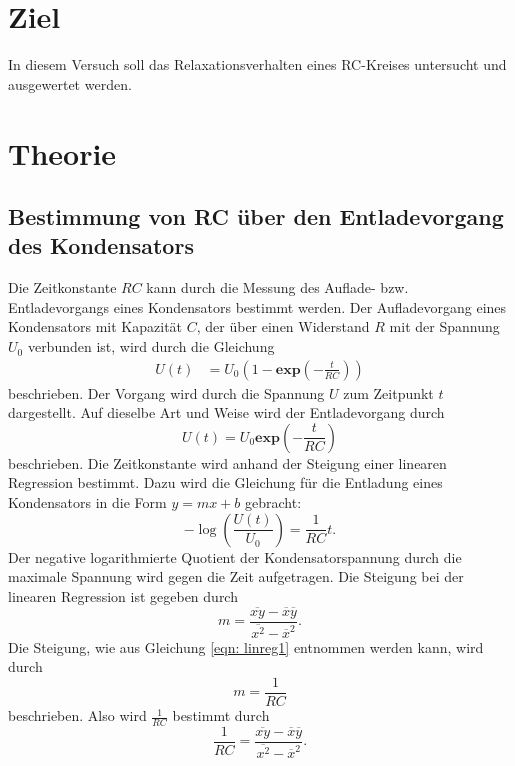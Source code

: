 
\section{Ziel}
In diesem Versuch soll das Relaxationsverhalten eines RC-Kreises untersucht und ausgewertet werden. 

\section{Theorie}
\cite{versuch}
\label{sec:Theorie}
\subsection{Bestimmung von RC über den Entladevorgang des Kondensators}
Die Zeitkonstante $RC$ kann durch die Messung des Auflade- bzw. Entladevorgangs eines Kondensators bestimmt werden.
Der Aufladevorgang eines Kondensators mit Kapazität $C$, der über einen Widerstand $R$ mit der Spannung $U_{0}$ verbunden ist, wird durch die Gleichung
\begin{align*}
     U(t)&= U_{0} (1-\mathbf{exp}(-\frac{t}{RC}))
\end{align*}
beschrieben. Der Vorgang wird durch die Spannung $U$ zum Zeitpunkt $t$ dargestellt. 
Auf dieselbe Art und Weise wird der Entladevorgang durch
\begin{equation*}
     U(t) = U_{0} \mathbf{exp}(-\frac{t}{RC})
\end{equation*}
beschrieben.
Die Zeitkonstante wird anhand der Steigung einer linearen Regression bestimmt.
Dazu wird die Gleichung für die Entladung eines Kondensators in die Form $y=mx+b$ gebracht:
\begin{equation}
    - \log(\frac{U(t)}{U_{0}}) = \frac{1}{RC} t.
    \label{eqn: linreg1}
\end{equation}
Der negative logarithmierte Quotient der Kondensatorspannung durch die maximale Spannung wird gegen die Zeit aufgetragen.
Die Steigung bei der linearen Regression ist gegeben durch
\begin{equation*}
    m = \frac{\overline{xy} - \overline{x}\overline{y}}{\overline{x^2} - \overline{x}^2}.
\end{equation*}
Die Steigung, wie aus Gleichung \eqref{eqn: linreg1} entnommen werden kann, wird durch
\begin{equation*}
    m = \frac{1}{RC}
\end{equation*}
beschrieben. Also wird $\frac{1}{RC}$ bestimmt durch
\begin{equation}
    \frac{1}{RC}= \frac{\overline{xy} - \overline{x}\overline{y}}{\overline{x^2} - \overline{x}^2}.
    \label{eqn: RC}
\end{equation}
